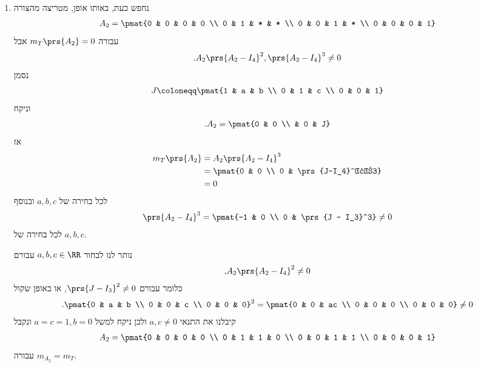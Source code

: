 \documentclass[a4paper,10pt,twoside,openany]{book}
\begin{document}
\begin{solution}
\begin{enumerate}
\item
נחפש כעת, באותו אופן, מטריצה מהצורה
\begin{align*}
A_2 = \pmat{0 & 0 & 0 & 0 \\ 0 & 1 & * & * \\ 0 & 0 & 1 & * \\ 0 & 0 & 0 & 1}
\end{align*}
עבורה
$m_T\prs{A_2} = 0$
אבל
\begin{align*}
\text{.} A_2 \prs{A_2 - I_4}^2, \prs{A_2 - I_4}^3 \neq 0
\end{align*}
נסמן
\begin{align*}
J \coloneqq \pmat{1 & a & b \\ 0 & 1 & c \\ 0 & 0 & 1}
\end{align*}
וניקח
\begin{align*}
\text{.} A_2 = \pmat{0 & 0 \\ & 0 & J}
\end{align*}
אז
\begin{align*}
m_T\prs{A_2} &= A_2 \prs{A_2 - I_4}^3
\\&=
\pmat{0 & 0 \\ 0 & \prs{J-I_4}^עב3}
\\&=
0
\end{align*}
לכל בחירה של
$a,b,c$
ובנוסף
\begin{align*}
\prs{A_2 - I_4}^3 = \pmat{-1 & 0 \\ 0 & \prs{J - I_3}^3} \neq 0
\end{align*}
לכל בחירה של
$a,b,c$.

נותר לנו לבחור
$a,b,c \in \RR$
עבורם
\begin{align*}
\text{,} A_2 \prs{A_2 - I_4}^2 \neq 0
\end{align*}
כלומר עבורם
$\prs{J-I_3}^2 \neq 0$,
או באופן שקול
\begin{align*}
\text{.} \pmat{0 & a & b \\ 0 & 0 & c \\ 0 & 0 & 0}^2 = \pmat{0 & 0 & ac \\ 0 & 0 & 0 \\ 0 & 0 & 0} \neq 0
\end{align*}
קיבלנו את התנאי
$a,c \neq 0$
ולכן ניקח למשל
$a=c=1, b=0$
ונקבל
\begin{align*}
A_2 = \pmat{0 & 0 & 0 & 0 \\ 0 & 1 & 1 & 0 \\ 0 & 0 & 1 & 1 \\ 0 & 0 & 0 & 1}
\end{align*}
עבורה
$m_{A_2} = m_T$.
\end{enumerate}
\end{solution}
\end{document}
